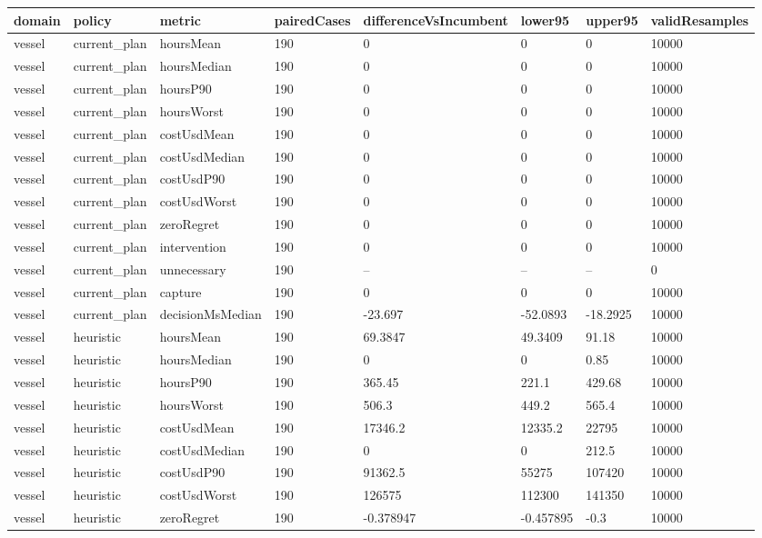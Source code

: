 \begin{tabular}{llllllll}
\toprule
domain & policy & metric & pairedCases & differenceVsIncumbent & lower95 & upper95 & validResamples \\
\midrule
vessel & current\_plan & hoursMean & 190 & 0 & 0 & 0 & 10000 \\
vessel & current\_plan & hoursMedian & 190 & 0 & 0 & 0 & 10000 \\
vessel & current\_plan & hoursP90 & 190 & 0 & 0 & 0 & 10000 \\
vessel & current\_plan & hoursWorst & 190 & 0 & 0 & 0 & 10000 \\
vessel & current\_plan & costUsdMean & 190 & 0 & 0 & 0 & 10000 \\
vessel & current\_plan & costUsdMedian & 190 & 0 & 0 & 0 & 10000 \\
vessel & current\_plan & costUsdP90 & 190 & 0 & 0 & 0 & 10000 \\
vessel & current\_plan & costUsdWorst & 190 & 0 & 0 & 0 & 10000 \\
vessel & current\_plan & zeroRegret & 190 & 0 & 0 & 0 & 10000 \\
vessel & current\_plan & intervention & 190 & 0 & 0 & 0 & 10000 \\
vessel & current\_plan & unnecessary & 190 & -- & -- & -- & 0 \\
vessel & current\_plan & capture & 190 & 0 & 0 & 0 & 10000 \\
vessel & current\_plan & decisionMsMedian & 190 & -23.697 & -52.0893 & -18.2925 & 10000 \\
vessel & heuristic & hoursMean & 190 & 69.3847 & 49.3409 & 91.18 & 10000 \\
vessel & heuristic & hoursMedian & 190 & 0 & 0 & 0.85 & 10000 \\
vessel & heuristic & hoursP90 & 190 & 365.45 & 221.1 & 429.68 & 10000 \\
vessel & heuristic & hoursWorst & 190 & 506.3 & 449.2 & 565.4 & 10000 \\
vessel & heuristic & costUsdMean & 190 & 17346.2 & 12335.2 & 22795 & 10000 \\
vessel & heuristic & costUsdMedian & 190 & 0 & 0 & 212.5 & 10000 \\
vessel & heuristic & costUsdP90 & 190 & 91362.5 & 55275 & 107420 & 10000 \\
vessel & heuristic & costUsdWorst & 190 & 126575 & 112300 & 141350 & 10000 \\
vessel & heuristic & zeroRegret & 190 & -0.378947 & -0.457895 & -0.3 & 10000 \\

\end{tabular}

